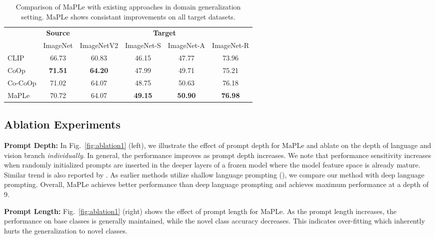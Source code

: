 \documentclass[10pt,twocolumn,letterpaper]{article}
\newcommand{\tablestyle}[2]{\setlength{\tabcolsep}{#1}\renewcommand{\arraystretch}{#2}\centering\footnotesize}
\begin{document}
\begin{table}[!t]
    \centering
\tablestyle{6pt}{1.1}
\addtolength{\tabcolsep}{-4.5pt}
    \begin{tabular}{l ccccc}
    \toprule
    & \textbf{Source} & \multicolumn{4}{c}{\textbf{Target}} \\ \cmidrule(lr){2-2} \cmidrule(lr){3-6}
     & ImageNet & ImageNetV2 & ImageNet-S & ImageNet-A & ImageNet-R \\
    \midrule
    CLIP &  66.73 & 60.83 & {46.15} & 47.77 & {73.96} \\
    CoOp &  \textbf{71.51} & \textbf{64.20} & 47.99  & 49.71  & 75.21  \\
    Co-CoOp & 71.02 & {64.07} & 48.75 & 50.63 & 76.18  \\
    \midrule
    \rowcolor{tabhighlight} MaPLe & 70.72 & {64.07} & \textbf{49.15} & \textbf{50.90}  & \textbf{76.98} \\
    \bottomrule
    \end{tabular}
        \caption{ Comparison of MaPLe with existing approaches in domain generalization setting. MaPLe shows consistant improvements on all target datasets.
    }
    \label{tab:robustness}
\end{table}

\subsection{Ablation Experiments}
\noindent \textbf{Prompt Depth:} 
\noindent In Fig.~\ref{fig:ablation1} (left), we illustrate the effect of prompt depth  for MaPLe and ablate on the depth of language and vision branch \emph{individually}. In general, the performance improves as prompt depth increases. We note that performance sensitivity increases when randomly initialized prompts are inserted in the deeper layers of a frozen model where the model feature space is already mature. Similar trend is also reported by \cite{jia2022visual}. As earlier methods utilize shallow language prompting (), we compare our method with deep language prompting. Overall, MaPLe achieves better performance than deep language prompting and achieves maximum performance at a depth of 9. 

\noindent\textbf{Prompt Length:} 
Fig.~\ref{fig:ablation1} (right) shows the effect of prompt length for MaPLe. As the prompt length increases, the performance on base classes is generally maintained, while the novel class accuracy decreases. This indicates over-fitting which inherently hurts the generalization to novel classes.
\end{document}
